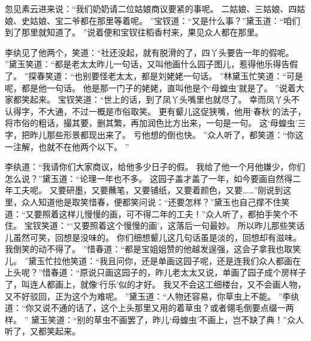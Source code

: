 忽见素云进来说：“我们奶奶请二位姑娘商议要紧的事呢。
二姑娘、三姑娘、四姑娘、史姑娘、宝二爷都在那里等着呢。
”宝钗道：“又是什么事？”黛玉道：“咱们到了那里就知道了。
”说着便和宝钗往稻香村来，果见众人都在那里。
\par
李纨见了他两个，笑道：“社还没起，就有脱滑的了，四丫头要告一年的假呢。
”黛玉笑道：“都是老太太昨儿一句话，又叫他画什么园子图儿，惹得他乐得告假了。
”探春笑道：“也别要怪老太太，都是刘姥姥一句话。
”林黛玉忙笑道：“可是呢，都是他一句话。
他是那一门子的姥姥，直叫他是个‘母蝗虫’就是了。
”说着大家都笑起来。
宝钗笑道：“世上的话，到了凤丫头嘴里也就尽了。
幸而凤丫头不认得字，不大通，不过一概是市俗取笑。
更有颦儿这促狭嘴，他用‘春秋’的法子，将市俗的粗话，撮其要，删其繁，再加润色比方出来，一句是一句。
这‘母蝗虫’三字，把昨儿那些形景都现出来了。
亏他想的倒也快。
”众人听了，都笑道：“你这一注解，也就不在他两个以下。
”\par
李纨道：“我请你们大家商议，给他多少日子的假。
我给了他一个月他嫌少，你们怎么说？”黛玉道：“论理一年也不多。
这园子盖才盖了一年，如今要画自然得二年工夫呢。
又要研墨，又要蘸笔，又要铺纸，又要着颜色，又要……”刚说到这里，众人知道他是取笑惜春，便都笑问说：“还要怎样？”黛玉也自己撑不住笑道：“又要照着这样儿慢慢的画，可不得二年的工夫！”众人听了，都拍手笑个不住。
宝钗笑道：“‘又要照着这个慢慢的画’，这落后一句最妙。
所以昨儿那些笑话儿虽然可笑，回想是没味的。
你们细想颦儿这几句话虽是淡的，回想却有滋味。
我倒笑的动不得了。
”惜春道：“都是宝姐姐赞的他越发逞强，这会子拿我也取笑儿。
”黛玉忙拉他笑道：“我且问你，还是单画这园子呢，还是连我们众人都画在上头呢？”惜春道：“原说只画这园子的，昨儿老太太又说，单画了园子成个房样子了，叫连人都画上，就像‘行乐’似的才好。
我又不会这工细楼台，又不会画人物，又不好驳回，正为这个为难呢。
”黛玉道：“人物还容易，你草虫上不能。
”李纨道：“你又说不通的话了，这个上头那里又用的着草虫？或者翎毛倒要点缀一两样。
”
黛玉笑道：“别的草虫不画罢了，昨儿‘母蝗虫’不画上，岂不缺了典！”众人听了，又都笑起来。
